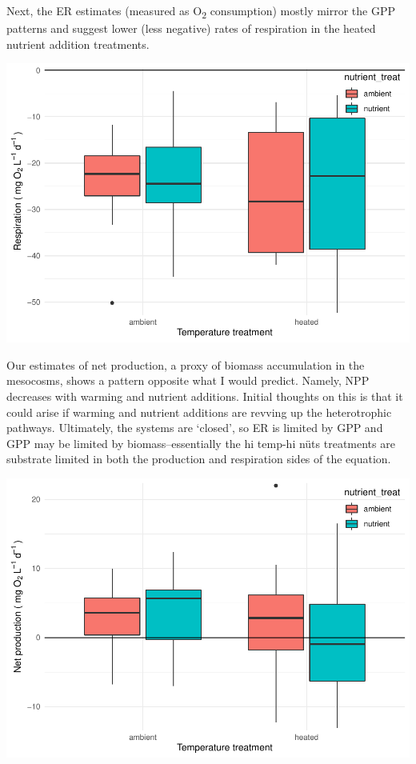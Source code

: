\documentclass[
]{article}
\begin{document}
Next, the ER estimates (measured as O\textsubscript{2} consumption)
mostly mirror the GPP patterns and suggest lower (less negative) rates
of respiration in the heated nutrient addition treatments.

\includegraphics{GPP-report_files/figure-latex/cont er boxplots-1.pdf}

Our estimates of net production, a proxy of biomass accumulation in the
mesocosms, shows a pattern opposite what I would predict. Namely, NPP
decreases with warming and nutrient additions. Initial thoughts on this
is that it could arise if warming and nutrient additions are revving up
the heterotrophic pathways. Ultimately, the systems are `closed', so ER
is limited by GPP and GPP may be limited by biomass--essentially the hi
temp-hi nüts treatments are substrate limited in both the production and
respiration sides of the equation.

\includegraphics{GPP-report_files/figure-latex/cont np boxplots-1.pdf}
\end{document}
